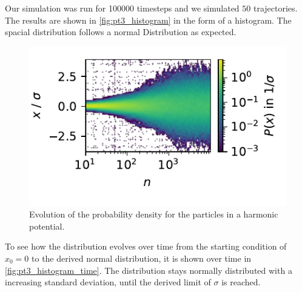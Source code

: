 \documentclass[
    parskip=half, 
    twoside=false,
    twocolumn=true,
    fontsize=11pt,
]{scrarticle}
\begin{document}
Our simulation was run for \SI{100000}{} timesteps and we simulated $50$ trajectories. 
The results are shown in \autoref{fig:pt3_histogram} in the form of a histogram.
The spacial distribution follows a normal Distribution as expected.


\begin{figure}
    \centering
    \includegraphics{figures/03 histogram evolution.pdf}
    \caption{
        Evolution of the probability density for the particles in a harmonic potential.
    }
    \label{fig:pt3_histogram_time}
\end{figure}
To see how the distribution evolves over time from the starting condition of $x_0=0$ to the derived normal distribution, it is shown over time in \autoref{fig:pt3_histogram_time}.
The distribution stays normally distributed with a increasing standard deviation, until the derived limit of $\sigma$ is reached.
\end{document}
